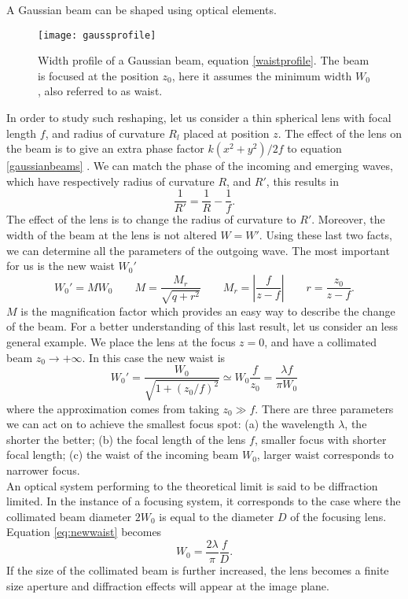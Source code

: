 A Gaussian beam can be shaped using optical elements.
\begin{figure}
\centering
\texttt{[image: gaussprofile]}
\caption{Width profile of a Gaussian beam, equation \eqref{waistprofile}. The beam is focused at the position $z_0$, here it assumes the minimum width $W_0$, also referred to as waist.}
\label{gaussprofile}
\end{figure}
In order to study such reshaping, let us consider a thin spherical lens with focal length $f$, and radius of curvature $R_l$ placed at position $z$. The effect of the lens on the beam is to give an extra phase factor $k(x^2 + y^2)/2f$ to equation \eqref{gaussianbeams} \cite{beamparameters}. We can match the phase of the incoming and emerging waves, which have respectively radius of curvature $R$, and $R'$, this results in
\begin{equation}
\frac{1}{R'} = \frac{1}{R} - \frac{1}{f}.
\end{equation}
The effect of the lens is to change the radius of curvature to $R'$. Moreover, the width of the beam at the lens is not altered $W=W'$. Using these last two facts, we can determine all the parameters of the outgoing wave. The most important for us is the new waist $W_0'$
\begin{equation}
W_0' = MW_0 \qquad M = \frac{M_r}{\sqrt{q+r^2}} \qquad M_r = \left|\frac{f}{z-f}\right| \qquad r = \frac{z_0}{z-f}.
\end{equation}
$M$ is the magnification factor which provides an easy way to describe the change of the beam. For a better understanding of this last result, let us consider an less general example. We place the lens at the focus $z=0$, and have a collimated beam $z_0 \to +\infty $. In this case the new waist is
\begin{equation}
\label{eq:newwaist}
W_0' = \frac{W_0}{\sqrt{1 + (z_0/f)^2}} \simeq W_0\frac{f}{z_0} = \frac{\lambda f}{\pi W_0}
\end{equation}
where the approximation comes from taking $z_0\gg f$. There are three parameters we can act on to achieve the smallest focus spot: (a) the wavelength $\lambda$, the shorter the better; (b) the focal length of the lens $f$, smaller focus with shorter focal length; (c) the waist of the incoming beam $W_0$, larger waist corresponds to narrower focus.\\
An optical system performing to the theoretical limit is said to be diffraction limited. In the instance of a focusing system, it corresponds to the case where the collimated beam diameter $2W_0$ is equal to the diameter $D$ of the focusing lens. Equation \ref{eq:newwaist} becomes
\begin{equation}
W_0 = \frac{2\lambda}{\pi} \frac{f}{D}.
\end{equation}
If the size of the collimated beam is further increased, the lens becomes a finite size aperture and diffraction effects will appear at the image plane.

